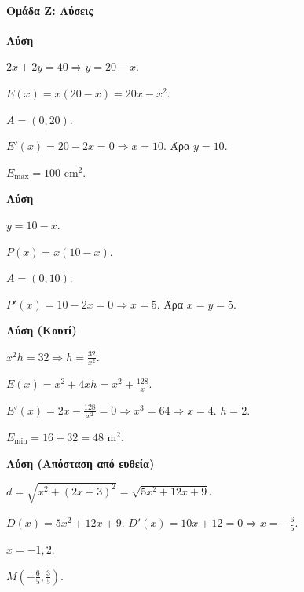 \documentclass[11pt,a4paper,modern]{FFExercises}
\begin{document}
\paragraph{Ομάδα Ζ: Λύσεις}

\askhsh %
\textbf{Λύση}
\begin{alist}
    \item $2x + 2y = 40 \Rightarrow y = 20 - x$.
    \item $E(x) = x(20 - x) = 20x - x^2$.
    \item $A = (0, 20)$.
    \item $E'(x) = 20 - 2x = 0 \Rightarrow x = 10$. Άρα $y = 10$.
    \item $E_{\max} = 100$ cm$^2$.
\end{alist}

\askhsh %
\textbf{Λύση}
\begin{alist}
    \item $y = 10 - x$.
    \item $P(x) = x(10 - x)$.
    \item $A = (0, 10)$.
    \item $P'(x) = 10 - 2x = 0 \Rightarrow x = 5$. Άρα $x = y = 5$.
\end{alist}

\askhsh %
\textbf{Λύση (Κουτί)}
\begin{alist}
    \item $x^2 h = 32 \Rightarrow h = \frac{32}{x^2}$.
    \item $E(x) = x^2 + 4xh = x^2 + \frac{128}{x}$.
    \item $E'(x) = 2x - \frac{128}{x^2} = 0 \Rightarrow x^3 = 64 \Rightarrow x = 4$. $h = 2$.
    \item $E_{\min} = 16 + 32 = 48$ m$^2$.
\end{alist}

\askhsh
\textbf{Λύση (Απόσταση από ευθεία)}
\begin{alist}
    \item $d = \sqrt{x^2 + (2x+3)^2} = \sqrt{5x^2 + 12x + 9}$.
    \item $D(x) = 5x^2 + 12x + 9$. $D'(x) = 10x + 12 = 0 \Rightarrow x = -\frac{6}{5}$.
    \item $x = -1{,}2$.
    \item $M\left(-\frac{6}{5}, \frac{3}{5}\right)$.
\end{alist}
\end{document}
